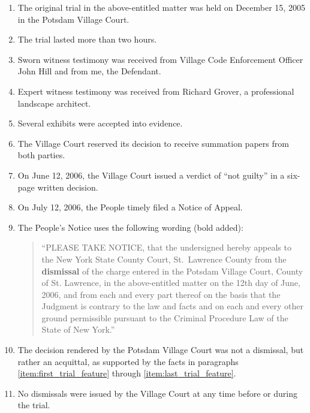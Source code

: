 \documentclass[12pt]{article}
\begin{document}
\begin{enumerate}

\item The original trial in the above-entitled matter was held on December 15, 2005 in the Potsdam Village Court.

\item \label{item:first_trial_feature} The trial lasted more than two hours.

\item Sworn witness testimony was received from Village Code Enforcement Officer John Hill and from me, the Defendant.  

\item Expert witness testimony was received from Richard Grover, a professional landscape architect.

\item Several exhibits were accepted into evidence.

\item The Village Court reserved its decision to receive summation papers from both parties.

\item \label{item:last_trial_feature}On June 12, 2006, the Village Court issued a verdict of ``not guilty'' in a six-page written decision.

\item On July 12, 2006, the People timely filed a Notice of Appeal.
 

\item The People's Notice uses the following wording (bold added):
\begin{quote}
``PLEASE TAKE NOTICE, that the undersigned hereby appeals to the New York State County Court, St.\ Lawrence County from the {\bf dismissal} of the charge entered in the Potsdam Village Court, County of St. Lawrence, in the above-entitled matter on the 12th day of June, 2006, and from each and every part thereof on the basis that the Judgment is contrary to the law and facts and on each and every other ground permissible pursuant to the Criminal Procedure Law of the State of New York.''
\end{quote}

\item The decision rendered by the Potsdam Village Court was not a dismissal, but rather an acquittal, as supported by the facts in paragraphs \ref{item:first_trial_feature} through \ref{item:last_trial_feature}.

\item No dismissals were issued by the Village Court at any time before or during the trial.


\end{enumerate}
\end{document}
